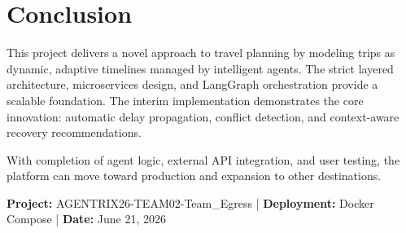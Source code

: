 \documentclass[11pt]{article}
\begin{document}
\section{Conclusion}

This project delivers a novel approach to travel planning by modeling trips as dynamic, adaptive timelines managed by intelligent agents. The strict layered architecture, microservices design, and LangGraph orchestration provide a scalable foundation. The interim implementation demonstrates the core innovation: automatic delay propagation, conflict detection, and context-aware recovery recommendations.

With completion of agent logic, external API integration, and user testing, the platform can move toward production and expansion to other destinations.

\vspace{0.8cm}
\noindent\textbf{Project:} AGENTRIX26-TEAM02-Team\_Egress | \textbf{Deployment:} Docker Compose | \textbf{Date:} June 21, 2026
\end{document}
